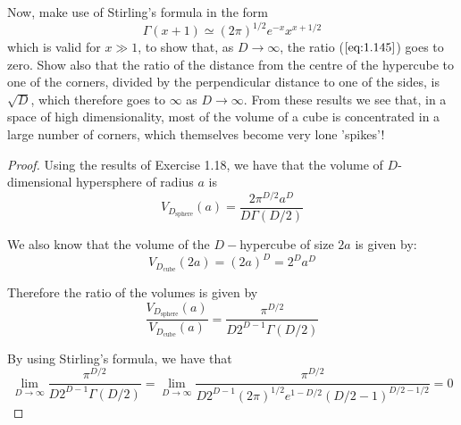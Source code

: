 Now, make use of Stirling's formula in the form
\begin{equation}\label{eq:1.145}\tag{1.145}
    \Gamma(x + 1) \simeq (2\pi)^{1/2} e^{-x} x^{x + 1/2}
\end{equation}
which is valid for $x \gg 1$, to show that, as $D \to \infty$, the
ratio ($\ref{eq:1.145}$) goes to zero. Show also that the ratio
of the distance from the centre of the hypercube to one
of the corners, divided by the perpendicular distance to one of the
sides, is $\sqrt{D}$, which therefore goes to $\infty$ as $D \to \infty$.
From these results we see that, in a space of high dimensionality,
most of the volume of a cube is concentrated in a large number
of corners, which themselves become very lone 'spikes'!

\vspace{1em}

\begin{proof}
    Using the results of Exercise 1.18, we have that the volume of 
    $D$-dimensional hypersphere of radius $a$ is 
    \[
        V_D_{\text{sphere}}(a) = \frac{2\pi^{D/2} a^D}{D\Gamma(D/2)}
    \] 

    We also know that the volume of the $D-$hypercube of size $2a$ 
    is given by:
    \[
        V_D_{\text{cube}}(2a) = (2a)^D = 2^D a^D
    \] 

    Therefore the ratio of the volumes is given by
    \begin{equation}\tag{1.145}
        \frac{V_D_{\text{sphere}}(a)}{V_D_{\text{cube}}(a)} = \frac{\pi^{D/2}}{D 2^{D - 1}\Gamma(D/2)}
    \end{equation}

    By using Stirling's formula, we have that
    \[
        \lim_{D \to \infty} \frac{\pi^{D/2}}{D 2^{D - 1}\Gamma(D/2)}
    = \lim_{D \to \infty} \frac{\pi^{D/2}}{D 2^{D - 1} (2\pi)^{1/2}e^{1 - D/2} (D/2 - 1)^{D/2 - 1/2}} = 0
    \] 
\end{proof}
